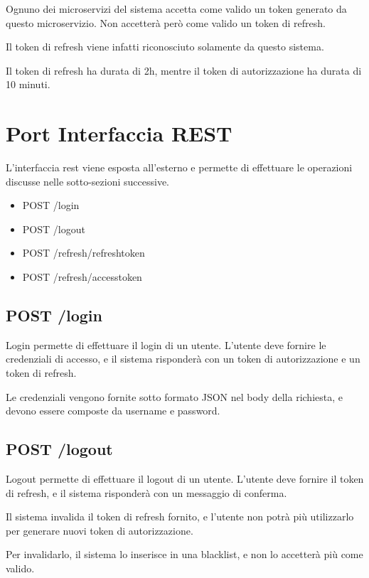 Ognuno dei microservizi del sistema accetta come valido un token generato da questo microservizio. Non accetterà però come valido un token di refresh.

Il token di refresh viene infatti riconosciuto solamente da questo sistema.

Il token di refresh ha durata di 2h, mentre il token di autorizzazione ha durata di 10 minuti.

\section{Port Interfaccia REST}

L'interfaccia rest viene esposta all'esterno e permette di effettuare le operazioni discusse nelle sotto-sezioni successive.

\begin{itemize}
    \item POST /login
    \item POST /logout
    \item POST /refresh/refreshtoken
    \item POST /refresh/accesstoken
\end{itemize}

\subsection{POST /login}

Login permette di effettuare il login di un utente. L'utente deve fornire le credenziali di accesso, e il sistema risponderà con un token di autorizzazione e un token di refresh.

Le credenziali vengono fornite sotto formato JSON nel body della richiesta, e devono essere composte da username e password.

\subsection{POST /logout}

Logout permette di effettuare il logout di un utente. L'utente deve fornire il token di refresh, e il sistema risponderà con un messaggio di conferma.

Il sistema invalida il token di refresh fornito, e l'utente non potrà più utilizzarlo per generare nuovi token di autorizzazione.

Per invalidarlo, il sistema lo inserisce in una blacklist, e non lo accetterà più come valido.

